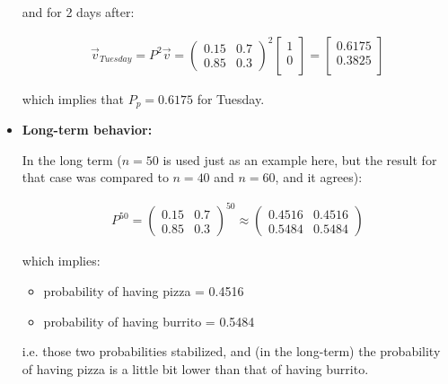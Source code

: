 \documentclass[paper=a4, fontsize=11pt]{scrartcl} %
\numberwithin{equation}{section} %
\numberwithin{figure}{section} %
\numberwithin{table}{section} %
\begin{document}
\begin{itemize}
and for 2 days after:

\begin{equation}
\begin{split}
\vec{v}_{Tuesday} = P^{2}\vec{v} = \left(\begin{array}{cc} 0.15 & 0.7\\ 0.85 & 0.3 \end{array}\right)^{2} \begin{bmatrix}1 \\ 0 \\ \end{bmatrix} = \begin{bmatrix} 0.6175 \\ 0.3825 \\ \end{bmatrix} 
\end{split}
\label{eq:markov_matrix2}
\end{equation}

which implies that $P_{p} = 0.6175$ for Tuesday.

\item \textbf{Long-term behavior:}

In the long term ($n=50$ is used just as an example here, but the result for that case was compared to $n=40$ and $n=60$, and it agrees):

\begin{equation}
\begin{split}
P^{50} = \left(\begin{array}{cc} 0.15 & 0.7\\ 0.85 & 0.3 \end{array}\right)^{50}  \approx \left(\begin{array}{cc} 0.4516 & 0.4516\\ 0.5484 & 0.5484 \end{array}\right)
\end{split}
\label{eq:markov_matrix2}
\end{equation}

which implies:

\begin{itemize}
\item probability of having pizza = 0.4516
\item probability of having burrito = 0.5484
\end{itemize}

i.e. those two probabilities stabilized, and (in the long-term) the probability of having pizza is a little bit lower than that of having burrito.

\end{itemize}
\end{document}
